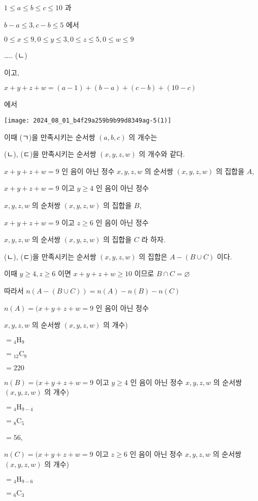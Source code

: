 \documentclass[10pt]{article}
\begin{document}
$1 \leq a \leq b \leq c \leq 10$ 과

$b-a \leq 3, c-b \leq 5$ 에서

$0 \leq x \leq 9,0 \leq y \leq 3,0 \leq z \leq 5,0 \leq w \leq 9$

….. (ㄴ)

이고,

$x+y+z+w=(a-1)+(b-a)+(c-b)+(10-c)$

에서

\begin{center}
\texttt{[image: 2024\_08\_01\_b4f29a259b9b99d8349ag-5(1)]}
\end{center}

이때 (ㄱ)을 만족시키는 순서쌍 $(a, b, c)$ 의 개수는

(ㄴ), (ㄷ)을 만족시키는 순서쌍 $(x, y, z, w)$ 의 개수와 같다.

$x+y+z+w=9$ 인 음이 아닌 정수 $x, y, z, w$ 의 순서쌍 $(x, y, z, w)$ 의 집합을 $A$,

$x+y+z+w=9$ 이고 $y \geq 4$ 인 음이 아닌 정수

$x, y, z, w$ 의 순처쌍 $(x, y, z, w)$ 의 집합을 $B$,

$x+y+z+w=9$ 이고 $z \geq 6$ 인 음이 아닌 정수

$x, y, z, w$ 의 순서쌍 $(x, y, z, w)$ 의 집합을 $C$ 라 하자.

(ㄴ), (ㄷ)을 만족시키는 순서쌍 $(x, y, z, w)$ 의 집합은 $A-(B \cup C)$ 이다.

이때 $y \geq 4, z \geq 6$ 이면 $x+y+z+w \geq 10$ 이므로 $B \cap C=\varnothing$

따라서 $n(A-(B \cup C))=n(A)-n(B)-n(C)$

$n(A)=(x+y+z+w=9$ 인 음이 아닌 정수

$x, y, z, w$ 의 순서쌍 $(x, y, z, w)$ 의 개수)

$={ }_{4} \mathrm{H}_{9}$

$={ }_{12} \mathrm{C}_{9}$

$=220$

$n(B)=(x+y+z+w=9$ 이고 $y \geq 4$ 인 음이 아닌 정수 $x, y, z, w$ 의 순서쌍 $(x, y, z, w)$ 의 개수)

$={ }_{4} \mathrm{H}_{9-4}$

$={ }_{8} \mathrm{C}_{5}$

$=56$,

$n(C)=(x+y+z+w=9$ 이고 $z \geq 6$ 인 음이 아닌 정수 $x, y, z, w$ 의 순서쌍 $(x, y, z, w)$ 의 개수)

$={ }_{4} \mathrm{H}_{9-6}$

$={ }_{6} \mathrm{C}_{3}$
\end{document}
